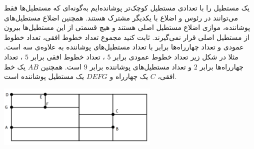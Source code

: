     \p 
یک مستطیل را با تعدادی مستطیل کوچک‌تر پوشانده‌ایم به‌گونه‌ای که مستطیل‌ها فقط می‌توانند در رئوس و اضلاع با یکدیگر مشترک هستند. همچنین اضلاع مستطیل‌های پوشاننده، موازی اضلاع مستطیل اصلی هستند و هیچ قسمتی از این مستطیل‌ها بیرون از مستطیل اصلی قرار نمی‌گیرند. ثابت کنید مجموع تعداد خطوط افقی، تعداد خطوط عمودی و تعداد چهارراه‌ها برابر با تعداد مستطیل‌های پوشاننده به علاوه‌ی سه است. مثلا در شکل زیر تعداد خطوط عمودی برابر
$5$
، تعداد خطوط افقی برابر
$5$
، تعداد چهارراه‌ها برابر
$2$
و تعداد مستطیل‌های پوشاننده برابر
$9$
است. همچنین
$AB$
یک خط افقی،
$C$
یک چهارراه و
$DEFG$
یک مستطیل پوشاننده است.
\begin{center}
\includegraphics[height=3cm]{1.png}
\end{center}